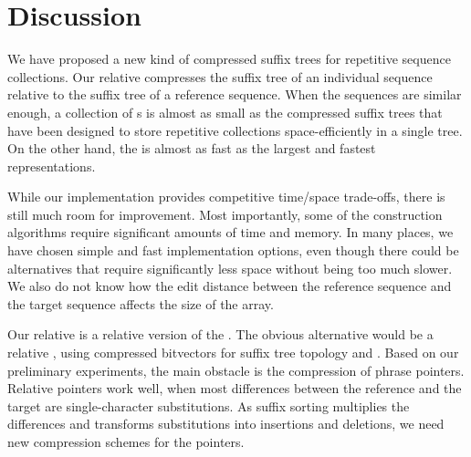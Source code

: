 
\section{Discussion}\label{section:discussion}

We have proposed a new kind of compressed suffix trees for repetitive sequence collections. Our relative \CST{} compresses the suffix tree of an individual sequence relative to the suffix tree of a reference sequence. When the sequences are similar enough, a collection of \RCST{}s is almost as small as the compressed suffix trees that have been designed to store repetitive collections space-efficiently in a single tree. On the other hand, the \RCST{} is almost as fast as the largest and fastest \CST{} representations.

While our \RCST{} implementation provides competitive time/space trade-offs, there is still much room for improvement. Most importantly, some of the construction algorithms require significant amounts of time and memory. In many places, we have chosen simple and fast implementation options, even though there could be alternatives that require significantly less space without being too much slower. We also do not know how the edit distance between the reference sequence and the target sequence affects the size of the \RLCP{} array.

Our relative \CST{} is a relative version of the \CSTnpr. The obvious alternative would be a relative \CSTsada, using \RLZ{} compressed bitvectors for suffix tree topology and \PLCP. Based on our preliminary experiments, the main obstacle is the compression of phrase pointers. Relative pointers work well, when most differences between the reference and the target are single-character substitutions. As suffix sorting multiplies the differences and transforms substitutions into insertions and deletions, we need new compression schemes for the pointers.
